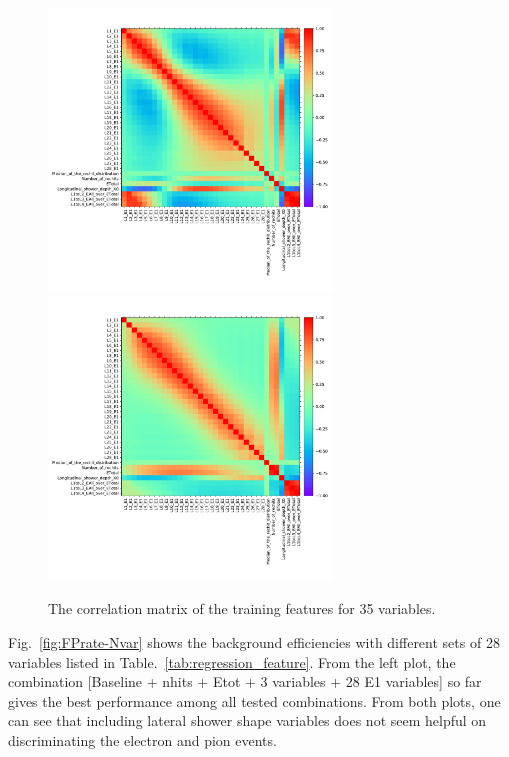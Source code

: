 \begin{figure}[p]
    \begin{center}  
    \includegraphics[width=0.67\textwidth]{Fig/fig_HGCAL/corr_matrix_35vars_v14-electron}\\
    \includegraphics[width=0.67\textwidth]{Fig/fig_HGCAL/corr_matrix_35vars_v14-pion}\\
    \caption{The correlation matrix of the training features for 35 variables.}
    \label{fig:corr-matrix-35vars}
    \end{center}
\end{figure}

Fig.~\ref{fig:FPrate-Nvar} shows the background efficiencies with different sets of 28 variables listed in Table.~\ref{tab:regression_feature}. From the left plot, the combination [Baseline + nhits + Etot + 3 variables + 28 E1 variables] so far gives the best performance among all tested combinations. From both plots, one can see that including lateral shower shape variables does not seem helpful on discriminating the electron and pion events.

